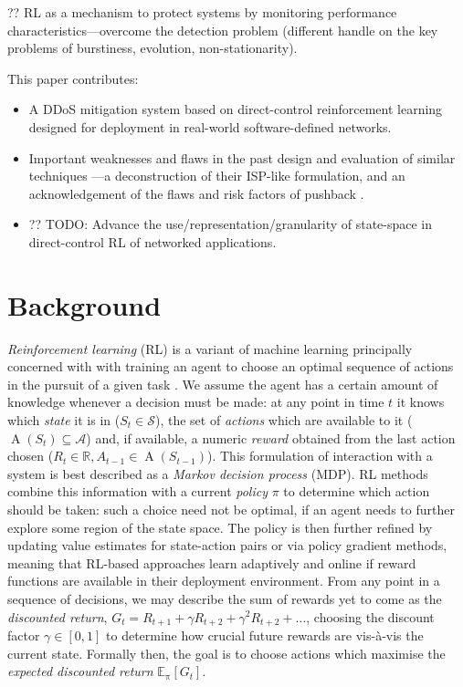 \documentclass[conference, letterpaper, 10pt, times]{IEEEtran}
\begin{document}
?? RL as a mechanism to protect systems by monitoring performance characteristics---overcome the detection problem (different handle on the key problems of burstiness, evolution, non-stationarity).

This paper contributes:
\begin{itemize}
	\item A DDoS mitigation system based on direct-control reinforcement learning designed for deployment in real-world software-defined networks.
	\item Important weaknesses and flaws in the past design and evaluation of similar techniques \cite{DBLP:journals/eaai/MalialisK15}---a deconstruction of their ISP-like formulation, and an acknowledgement of the flaws and risk factors of pushback \cite{DBLP:journals/ccr/MahajanBFIPS02a}.
	\item ?? TODO: Advance the use/representation/granularity of state-space in direct-control RL of networked applications.
\end{itemize}

\section{Background}
\emph{Reinforcement learning} (RL) is a variant of machine learning principally concerned with with training an agent to choose an optimal sequence of actions in the pursuit of a given task \cite{RL2E}.
We assume the agent has a certain amount of knowledge whenever a decision must be made: at any point in time $t$ it knows which \emph{state} it is in ($S_t \in \mathcal{S}$), the set of \emph{actions} which are available to it ($\operatorname{A}(S_t) \subseteq \mathcal{A}$) and, if available, a numeric \emph{reward} obtained from the last action chosen ($R_t \in \mathbb{R}, A_{t-1} \in \operatorname{A}(S_{t-1})$).
This formulation of interaction with a system is best described as a \emph{Markov decision process} (MDP).
RL methods combine this information with a current \emph{policy} $\pi$ to determine which action should be taken: such a choice need not be optimal, if an agent needs to further explore some region of the state space.
The policy is then further refined by updating value estimates for state-action pairs or via policy gradient methods, meaning that RL-based approaches learn adaptively and online if reward functions are available in their deployment environment.
From any point in a sequence of decisions, we may describe the sum of rewards yet to come as the \emph{discounted return}, $G_t = R_{t+1} + \gamma R_{t+2} + \gamma^2 R_{t+2} + \ldots$, choosing the discount factor $\gamma \in [0,1]$ to determine how crucial future rewards are vis-\`{a}-vis the current state.
Formally then, the goal is to choose actions which maximise the \emph{expected discounted return} $\operatorname{\mathbb{E}_{\pi}}[G_t]$.
\end{document}
